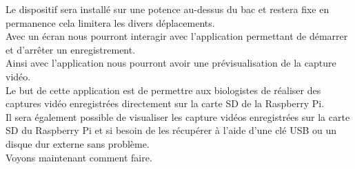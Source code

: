     \begin{flushleft}
        Le dispositif sera installé sur une potence au-dessus du bac et restera fixe en permanence cela limitera les divers déplacements.\\[0.2cm]                
    
        Avec un écran nous pourront interagir avec l'application permettant de démarrer et d'arrêter un enregistrement.\\[0.2cm]

        Ainsi avec l'application nous pourront avoir une prévisualisation de la capture vidéo.\\[0.2cm]
    
        Le but de cette application est de permettre aux biologistes de réaliser des captures vidéo enregistrées directement sur la carte SD de la Raspberry Pi.\\[0.2cm]

        Il sera également possible de visualiser les capture vidéos enregistrées sur la carte SD du Raspberry Pi et si besoin de les récupérer à l'aide d'une clé USB ou un disque dur externe sans problème.\\[0.2cm]

        Voyons maintenant comment faire.
    \end{flushleft}